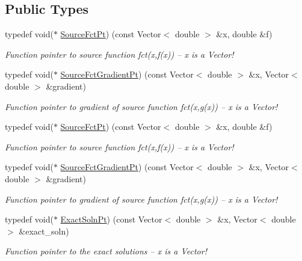 \subsection*{Public Types}
\begin{DoxyCompactItemize}
\item 
typedef void($\ast$ \hyperlink{classoomph_1_1MyBiharmonicEquations_a17bd58054c66229016eb1c52eab36bc1}{Source\+Fct\+Pt}) (const Vector$<$ double $>$ \&x, double \&f)
\begin{DoxyCompactList}\small\item\em Function pointer to source function fct(x,f(x)) -- x is a Vector! \end{DoxyCompactList}\item 
typedef void($\ast$ \hyperlink{classoomph_1_1MyBiharmonicEquations_af007c03701e888fed7375cb4537f0046}{Source\+Fct\+Gradient\+Pt}) (const Vector$<$ double $>$ \&x, Vector$<$ double $>$ \&gradient)
\begin{DoxyCompactList}\small\item\em Function pointer to gradient of source function fct(x,g(x)) -- x is a Vector! \end{DoxyCompactList}\item 
typedef void($\ast$ \hyperlink{classoomph_1_1MyBiharmonicEquations_a17bd58054c66229016eb1c52eab36bc1}{Source\+Fct\+Pt}) (const Vector$<$ double $>$ \&x, double \&f)
\begin{DoxyCompactList}\small\item\em Function pointer to source function fct(x,f(x)) -- x is a Vector! \end{DoxyCompactList}\item 
typedef void($\ast$ \hyperlink{classoomph_1_1MyBiharmonicEquations_af007c03701e888fed7375cb4537f0046}{Source\+Fct\+Gradient\+Pt}) (const Vector$<$ double $>$ \&x, Vector$<$ double $>$ \&gradient)
\begin{DoxyCompactList}\small\item\em Function pointer to gradient of source function fct(x,g(x)) -- x is a Vector! \end{DoxyCompactList}\item 
typedef void($\ast$ \hyperlink{classoomph_1_1MyBiharmonicEquations_a20238fec79ab67b90f3be58ea498e681}{Exact\+Soln\+Pt}) (const Vector$<$ double $>$ \&x, Vector$<$ double $>$ \&exact\+\_\+soln)
\begin{DoxyCompactList}\small\item\em Function pointer to the exact solutions -- x is a Vector! \end{DoxyCompactList}\end{DoxyCompactItemize}
